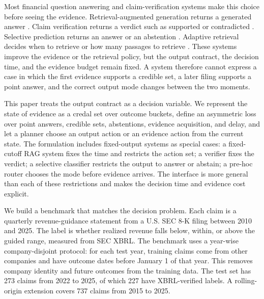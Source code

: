\documentclass[11pt]{article}
\begin{document}
Most financial question answering and claim-verification systems make this choice before seeing the evidence. Retrieval-augmented generation returns a generated answer \citep{lewis2020rag}. Claim verification returns a verdict such as supported or contradicted \citep{zhao2024findver,rangapur2025finfact}. Selective prediction returns an answer or an abstention \citep{chow1970optimum,geifman2017selective}. Adaptive retrieval decides when to retrieve or how many passages to retrieve \citep{jiang2023flare,jeong2024adaptiverag}. These systems improve the evidence or the retrieval policy, but the output contract, the decision time, and the evidence budget remain fixed. A system therefore cannot express a case in which the first evidence supports a credible set, a later filing supports a point answer, and the correct output mode changes between the two moments.

This paper treats the output contract as a decision variable. We represent the state of evidence as a credal set over outcome buckets, define an asymmetric loss over point answers, credible sets, abstentions, evidence acquisition, and delay, and let a planner choose an output action or an evidence action from the current state. The formulation includes fixed-output systems as special cases: a fixed-cutoff RAG system fixes the time and restricts the action set; a verifier fixes the verdict; a selective classifier restricts the output to answer or abstain; a pre-hoc router chooses the mode before evidence arrives. The interface is more general than each of these restrictions and makes the decision time and evidence cost explicit.

We build a benchmark that matches the decision problem. Each claim is a quarterly revenue-guidance statement from a U.S. SEC 8-K filing between 2010 and 2025. The label is whether realized revenue falls below, within, or above the guided range, measured from SEC XBRL. The benchmark uses a year-wise company-disjoint protocol: for each test year, training claims come from other companies and have outcome dates before January 1 of that year. This removes company identity and future outcomes from the training data. The test set has 273 claims from 2022 to 2025, of which 227 have XBRL-verified labels. A rolling-origin extension covers 737 claims from 2015 to 2025.
\end{document}

